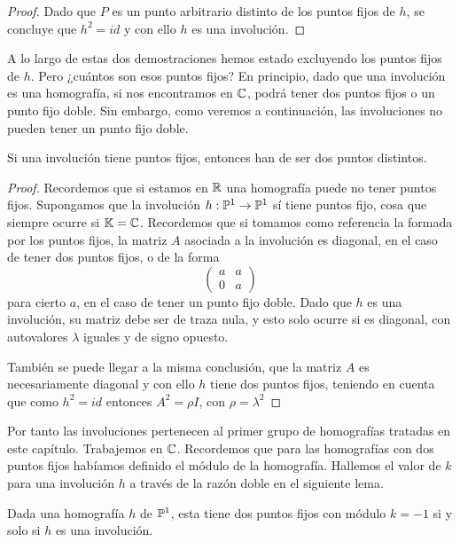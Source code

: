 \begin{proof}
	Dado que $P$ es un punto arbitrario distinto de los puntos fijos de $h$, se concluye que $h^2=id$ y con ello $h$ es una involución.
\end{proof}

A lo largo de estas dos demostraciones hemos estado excluyendo los puntos fijos de $h$. Pero ¿cuántos son esos puntos fijos? En principio, dado que una involución es una homografía, si nos encontramos en $\mathbb{C}$, podrá tener dos puntos fijos o un punto fijo doble. Sin embargo, como veremos a continuación, las involuciones no pueden tener un punto fijo doble.
\begin{lem}
	\label{C6_lem_involucion_puntosfijos}
	Si una involución tiene puntos fijos, entonces han de ser dos puntos distintos.
\end{lem}
\begin{proof}
	Recordemos que si estamos en $\mathbb{R}$ una homografía puede no tener puntos fijos. Supongamos que la involución $h:\mathbb{P}^1\rightarrow\mathbb{P}^1$ sí tiene puntos fijo, cosa que siempre ocurre si $\mathbb{K}=\mathbb{C}$. Recordemos que si tomamos como referencia la formada por los puntos fijos, la matriz $A$ asociada a la involución es diagonal, en el caso de tener dos puntos fijos, o de la forma
	\begin{equation*}
		\left( \begin{array}{cc}
			a&a\\
			0&a
		\end{array}\right) 
	\end{equation*}
	para cierto $a$, en el caso de tener un punto fijo doble. Dado que $h$ es una involución, su matriz debe ser de traza nula, y esto solo ocurre si es diagonal, con autovalores $\lambda$ iguales y de signo opuesto. 
	
	También se puede llegar a la misma conclusión, que la matriz $A$ es necesariamente diagonal y con ello $h$ tiene dos puntos fijos, teniendo en cuenta que como $h^2=id$ entonces $A^2=\rho I$, con $\rho=\lambda^2$
\end{proof}
Por tanto las involuciones pertenecen al primer grupo de homografías tratadas en este capítulo. Trabajemos en $\mathbb{C}$. Recordemos que para las homografías con dos puntos fijos habíamos definido el módulo de la homografía. Hallemos el valor de $k$ para una involución $h$ a través de la razón doble en el siguiente lema.
\begin{lem}\label{C6:lem_modulo1_sii_involucion}
	Dada una homografía $h$ de $\mathbb{P}^1$, esta tiene dos puntos fijos con módulo $k=-1$ si y solo si $h$ es una involución.
\end{lem}
